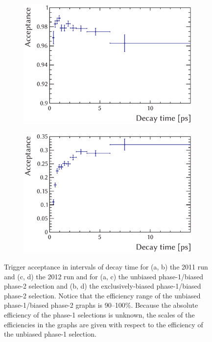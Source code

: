 \begin{figure}[htbp]
  \vspace*{0.02\textwidth}
  \begin{subfigure}{0.49\textwidth}
    \includegraphics[width=\textwidth]{graphics/analysis/trigTimeAcc_2012_UB}
    \caption{}
    \label{fig:trigAcc_2012_UB}
  \end{subfigure}%
  \hfill%
  \begin{subfigure}{0.49\textwidth}
    \includegraphics[width=\textwidth]{graphics/analysis/trigTimeAcc_2012_exclB}
    \caption{}
    \label{fig:trigAcc_2012_exclB}
  \end{subfigure}
  \caption{Trigger acceptance in intervals of decay time for (a, b) the 2011 run and (c, d) the 2012 run
           and for (a, c) the unbiased phase-1/biased phase-2 selection and (b, d) the exclusively-biased phase-1/biased phase-2 selection.
           Notice that the efficiency range of the unbiased phase-1/biased phase-2 graphs is 90--100\%.
           Because the absolute efficiency of the phase-1 selections is unknown, the scales of the efficiencies
           in the graphs are given with respect to the efficiency of the unbiased phase-1 selection.}
  \label{fig:trigAcc}
\end{figure}

